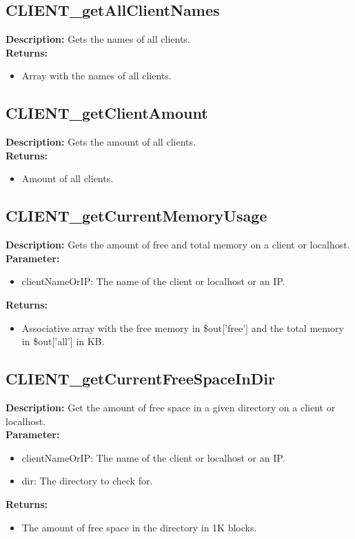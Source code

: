 \subsection{CLIENT\_getAllClientNames}
\textbf{Description:} Gets the names of all clients.\\
\textbf{Returns:}
\begin{itemize}
\item Array with the names of all clients.
\end{itemize}

\subsection{CLIENT\_getClientAmount}
\textbf{Description:} Gets the amount of all clients.\\
\textbf{Returns:}
\begin{itemize}
\item Amount of all clients.
\end{itemize}

\subsection{CLIENT\_getCurrentMemoryUsage}
\textbf{Description:} Gets the amount of free and total memory on a client or localhost.\\
\textbf{Parameter:}
\begin{itemize}
\item clientNameOrIP: The name of the client or localhost or an IP.
\end{itemize}
\textbf{Returns:}
\begin{itemize}
\item Associative array with the free memory in \$out['free'] and the total memory in \$out['all'] in KB.
\end{itemize}

\subsection{CLIENT\_getCurrentFreeSpaceInDir}
\textbf{Description:} Get the amount of free space in a given directory on a client or localhost.\\
\textbf{Parameter:}
\begin{itemize}
\item clientNameOrIP: The name of the client or localhost or an IP.
\item dir: The directory to check for.
\end{itemize}
\textbf{Returns:}
\begin{itemize}
\item The amount of free space in the directory in 1K blocks.
\end{itemize}

